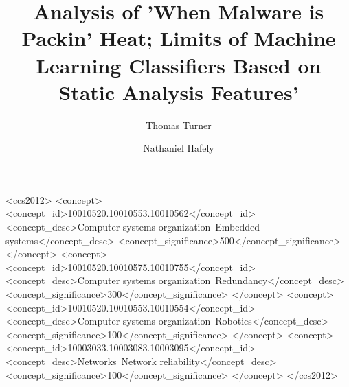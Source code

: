 \documentclass[sigconf]{acmart}
\begin{document}
\title[Static Analysis Limits of Packed Malware]{Analysis of 'When Malware is Packin' Heat; Limits of Machine Learning Classifiers Based on Static Analysis Features'}


\author{Thomas Turner}

\author{Nathaniel Hafely}


\renewcommand{\shortauthors}{B. Wang et al.}



%
%
\begin{CCSXML}
<ccs2012>
 <concept>
  <concept_id>10010520.10010553.10010562</concept_id>
  <concept_desc>Computer systems organization~Embedded systems</concept_desc>
  <concept_significance>500</concept_significance>
 </concept>
 <concept>
  <concept_id>10010520.10010575.10010755</concept_id>
  <concept_desc>Computer systems organization~Redundancy</concept_desc>
  <concept_significance>300</concept_significance>
 </concept>
 <concept>
  <concept_id>10010520.10010553.10010554</concept_id>
  <concept_desc>Computer systems organization~Robotics</concept_desc>
  <concept_significance>100</concept_significance>
 </concept>
 <concept>
  <concept_id>10003033.10003083.10003095</concept_id>
  <concept_desc>Networks~Network reliability</concept_desc>
  <concept_significance>100</concept_significance>
 </concept>
</ccs2012>  
\end{CCSXML}
\end{document}
